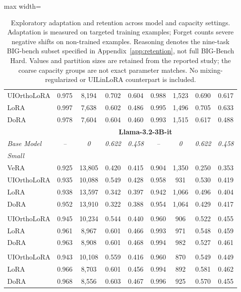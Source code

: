 \begin{table}[t]
\begin{adjustbox}{max width=\linewidth}
\begin{tabular}{l | c ccc | c ccc}
UIOrthoLoRA & 0.975 & 8,194 & 0.702 & 0.604 & 0.988 & 1,523 & 0.690 & 0.617 \\
LoRA         & 0.997 & 7,638 & 0.602 & 0.486 & 0.995 & 1,496 & 0.705 & 0.633 \\
DoRA         & 0.978 & 7,604 & 0.604 & 0.460 & 0.993 & 1,515 & 0.617 & 0.488 \\
\midrule
\multicolumn{1}{c}{} & \multicolumn{8}{c}{\textbf{Llama-3.2-3B-it}} \\
\midrule
\addlinespace[0.3ex]
\rowcolor{gray!10} \textit{Base Model} & \textit{--} & \textit{0} & \textit{0.622} & \textit{0.458} & \textit{--} & \textit{0} & \textit{0.622} & \textit{0.458} \\
\midrule
\multicolumn{9}{l}{\textit{Small}} \\
VeRA         & 0.925 & 13,805 & 0.420 & 0.415 & 0.904 & 1,350 & 0.250 & 0.353 \\
UIOrthoLoRA & 0.935 & 10,088 & 0.549 & 0.428 & 0.958 & 931 & 0.530 & 0.419 \\
LoRA         & 0.938    & 13,597    & 0.342    & 0.397    & 0.942 & 1,066 & 0.496 & 0.404 \\
DoRA         & 0.952 & 13,910 & 0.322 & 0.388 & 0.954 & 1,064 & 0.429 & 0.417 \\
\addlinespace
\multicolumn{9}{l}{\textit{Medium}} \\
UIOrthoLoRA & 0.945 & 10,234 & 0.544 & 0.440 & 0.960 & 906 & 0.522 & 0.455 \\
LoRA         & 0.961 & 8,967 & 0.601 & 0.466 & 0.993 & 971 & 0.548 & 0.459 \\
DoRA         & 0.963 & 8,908 & 0.601 & 0.468 & 0.994 & 982 & 0.527 & 0.461 \\
\addlinespace
\multicolumn{9}{l}{\textit{Large}} \\
UIOrthoLoRA & 0.943 & 10,108 & 0.559 & 0.416 & 0.960 & 870 & 0.549 & 0.449 \\
LoRA         & 0.966 & 8,703 & 0.601 & 0.456 & 0.994 & 892 & 0.581 & 0.462 \\
DoRA         & 0.968 & 8,556 & 0.603 & 0.467 & 0.996 & 925 & 0.570 & 0.455 \\
\bottomrule
\end{tabular}
\end{adjustbox}
\caption{Exploratory adaptation and retention across model and capacity settings. Adaptation is measured on targeted training examples; Forget counts severe negative shifts on non-trained examples. Reasoning denotes the nine-task BIG-bench subset specified in Appendix~\ref{app:retention}, not full BIG-Bench Hard. Values and partition sizes are retained from the reported study; the coarse capacity groups are not exact parameter matches. No mixing-regularized or UILinLoRA counterpart is included.}
\label{tab:combined_model_performance}
\end{table}
